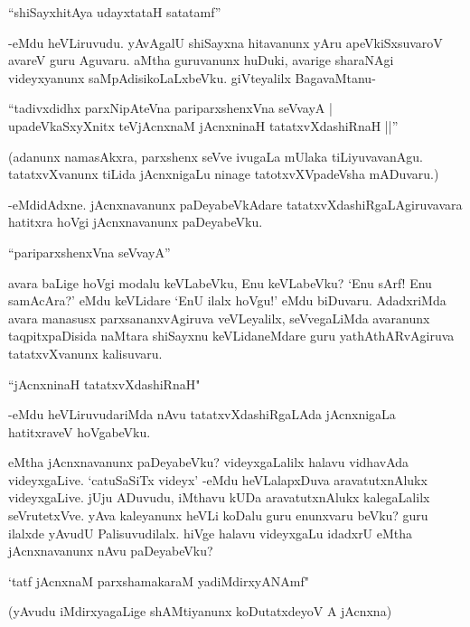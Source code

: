 \begin{shloka} 
``shiSayxhitAya udayxtataH satatamf'' 
\end{shloka}

-eMdu heVLiruvudu. yAvAgalU shiSayxna hitavanunx yAru apeVkiSxsuvaroV avareV guru Aguvaru. aMtha guruvanunx huDuki, avarige sharaNAgi videyxyanunx saMpAdisikoLaLxbeVku. giVteyalilx BagavaMtanu-

\begin{shloka}
``tadivxdidhx parxNipAteVna pariparxshenxVna seVvayA |\\
upadeVkaSxyXnitx teVjAcnxnaM jAcnxninaH tatatxvXdashiRnaH ||''
\end{shloka}

(adanunx namasAkxra, parxshenx seVve ivugaLa mUlaka tiLiyuvavanAgu. tatatxvXvanunx tiLida jAcnxnigaLu ninage tatotxvXVpadeVsha mADuvaru.)

-eMdidAdxne. jAcnxnavanunx paDeyabeVkAdare tatatxvXdashiRgaLAgiruvavara hatitxra hoVgi jAcnxnavanunx paDeyabeVku.

\begin{shloka}
``pariparxshenxVna seVvayA''
\end{shloka}

avara baLige hoVgi modalu keVLabeVku, Enu keVLabeVku? `Enu sArf! Enu samAcAra?' eMdu keVLidare `EnU ilalx hoVgu!' eMdu biDuvaru. AdadxriMda avara manasusx parxsananxvAgiruva veVLeyalilx, seVvegaLiMda avaranunx taqpitxpaDisida naMtara shiSayxnu keVLidaneMdare guru yathAthARvAgiruva tatatxvXvanunx kalisuvaru. 

\begin{shloka}
``jAcnxninaH tatatxvXdashiRnaH"
\end{shloka}

-eMdu heVLiruvudariMda nAvu tatatxvXdashiRgaLAda jAcnxnigaLa hatitxraveV hoVgabeVku.

eMtha jAcnxnavanunx paDeyabeVku? videyxgaLalilx halavu vidhavAda videyxgaLive. `catuSaSiTx videyx' -eMdu heVLalapxDuva aravatutxnAlukx videyxgaLive. jUju ADuvudu, iMthavu kUDa aravatutxnAlukx kalegaLalilx seVrutetxVve. yAva kaleyanunx heVLi koDalu guru enunxvaru beVku? guru ilalxde yAvudU Palisuvudilalx. hiVge halavu videyxgaLu idadxrU eMtha jAcnxnavanunx nAvu paDeyabeVku? 

\begin{shloka}
`tatf jAcnxnaM parxshamakaraM yadiMdirxyANAmf" 
\end{shloka}

(yAvudu iMdirxyagaLige shAMtiyanunx koDutatxdeyoV A jAcnxna)

